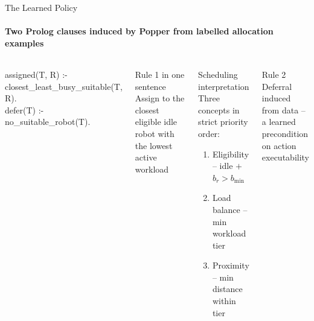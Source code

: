 \documentclass[aspectratio=169]{beamer}
\begin{document}
\begin{frame}[shrink=5]{The Learned Policy}
  \framesubtitle{Two Prolog clauses induced by Popper from labelled allocation examples}
  \begin{columns}[onlytextwidth]
      \begin{block}{}
        {\small\ttfamily
          assigned(T, R) :-\\
          \hspace{1.5em}closest\_least\_busy\_suitable(T, R).\\[0.4em]
          defer(T) :-\\
          \hspace{1.5em}no\_suitable\_robot(T).
        }
      \end{block}
      \vspace{0.3em}
      \begin{block}{Rule 1 in one sentence}
        Assign to the closest eligible idle robot with the lowest active workload
      \end{block}
      \begin{exampleblock}{Scheduling interpretation}
        Three concepts in strict priority order:
        \begin{enumerate}
          \item Eligibility -- idle $+$ $b_r > b_{\min}$
          \item Load balance -- min workload tier
          \item Proximity -- min distance within tier
        \end{enumerate}
      \end{exampleblock}
      \begin{alertblock}{Rule 2}
        Deferral induced from data -- a learned precondition on action executability
      \end{alertblock}
  \end{columns}
\end{frame}
\end{document}
